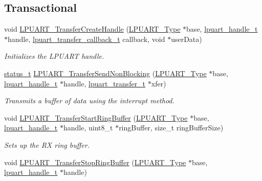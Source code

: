 \subsection*{Transactional}
\begin{DoxyCompactItemize}
\item 
void \mbox{\hyperlink{group__lpuart__driver_ga10eae12610523a624c1016882f8dba5f}{L\+P\+U\+A\+R\+T\+\_\+\+Transfer\+Create\+Handle}} (\mbox{\hyperlink{struct_l_p_u_a_r_t___type}{L\+P\+U\+A\+R\+T\+\_\+\+Type}} $\ast$base, \mbox{\hyperlink{struct__lpuart__handle}{lpuart\+\_\+handle\+\_\+t}} $\ast$handle, \mbox{\hyperlink{group__lpuart__driver_ga558e0c23c05831e446708a3935f36332}{lpuart\+\_\+transfer\+\_\+callback\+\_\+t}} callback, void $\ast$user\+Data)
\begin{DoxyCompactList}\small\item\em Initializes the L\+P\+U\+A\+RT handle. \end{DoxyCompactList}\item 
\mbox{\hyperlink{group__ksdk__common_gaaabdaf7ee58ca7269bd4bf24efcde092}{status\+\_\+t}} \mbox{\hyperlink{group__lpuart__driver_gafba986c473e5935131e63cb882cf26ff}{L\+P\+U\+A\+R\+T\+\_\+\+Transfer\+Send\+Non\+Blocking}} (\mbox{\hyperlink{struct_l_p_u_a_r_t___type}{L\+P\+U\+A\+R\+T\+\_\+\+Type}} $\ast$base, \mbox{\hyperlink{struct__lpuart__handle}{lpuart\+\_\+handle\+\_\+t}} $\ast$handle, \mbox{\hyperlink{group__lpuart__driver_ga1d4707ebc5d49dd655eedb7e5acd27fd}{lpuart\+\_\+transfer\+\_\+t}} $\ast$xfer)
\begin{DoxyCompactList}\small\item\em Transmits a buffer of data using the interrupt method. \end{DoxyCompactList}\item 
void \mbox{\hyperlink{group__lpuart__driver_ga5257b77491042af5913a8d91c66318e1}{L\+P\+U\+A\+R\+T\+\_\+\+Transfer\+Start\+Ring\+Buffer}} (\mbox{\hyperlink{struct_l_p_u_a_r_t___type}{L\+P\+U\+A\+R\+T\+\_\+\+Type}} $\ast$base, \mbox{\hyperlink{struct__lpuart__handle}{lpuart\+\_\+handle\+\_\+t}} $\ast$handle, uint8\+\_\+t $\ast$ring\+Buffer, size\+\_\+t ring\+Buffer\+Size)
\begin{DoxyCompactList}\small\item\em Sets up the RX ring buffer. \end{DoxyCompactList}\item 
void \mbox{\hyperlink{group__lpuart__driver_gad6a230a664808592aab153ea20e3d60b}{L\+P\+U\+A\+R\+T\+\_\+\+Transfer\+Stop\+Ring\+Buffer}} (\mbox{\hyperlink{struct_l_p_u_a_r_t___type}{L\+P\+U\+A\+R\+T\+\_\+\+Type}} $\ast$base, \mbox{\hyperlink{struct__lpuart__handle}{lpuart\+\_\+handle\+\_\+t}} $\ast$handle)

\end{DoxyCompactItemize}
